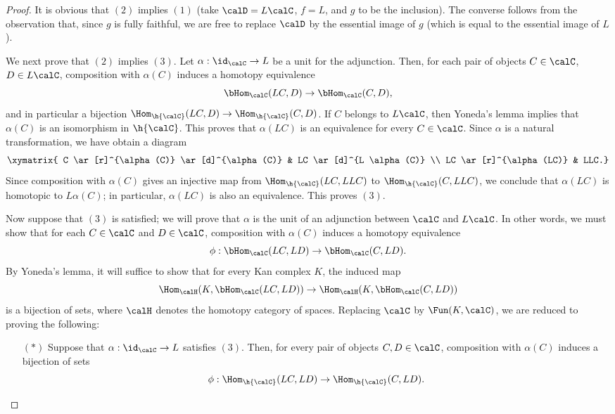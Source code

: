 \begin{proof}
It is obvious that $(2)$ implies $(1)$ (take $\calD= L\calC$, $f = L$, and $g$ to be the inclusion).
The converse follows from the observation that, since $g$ is fully faithful, we are free to replace $\calD$ by the essential image of $g$ (which is equal to the essential image of $L$).

We next prove that $(2)$ implies $(3)$. Let $\alpha: \id_{\calC} \rightarrow L$ be a unit
for the adjunction. Then, for each pair of objects $C \in \calC$, $D \in L \calC$, composition with $\alpha(C)$ induces a homotopy equivalence
$$ \bHom_{\calC}( LC, D) \rightarrow \bHom_{\calC}( C, D),$$
and in particular a bijection $\Hom_{\h{\calC}}(LC, D) \rightarrow \Hom_{\h{\calC}}(C,D)$.
If $C$ belongs to $L \calC$, then Yoneda's lemma implies that
$\alpha(C)$ is an isomorphism in $\h{\calC}$. This proves that $\alpha(LC)$ is an equivalence for every $C \in \calC$. Since $\alpha$ is a natural transformation, we have obtain a diagram
$$ \xymatrix{ C \ar[r]^{\alpha(C)} \ar[d]^{\alpha(C)} & LC \ar[d]^{L \alpha(C)}  \\
LC \ar[r]^{\alpha(LC)} & LLC.}$$
Since composition with $\alpha(C)$ gives an injective map
from $\Hom_{\h{\calC}}(LC,LLC)$ to $\Hom_{\h{\calC}}(C,LLC)$, we conclude that
$\alpha(LC)$ is homotopic to $L \alpha(C)$; in particular, $\alpha(LC)$ is also an equivalence. This proves $(3)$.

Now suppose that $(3)$ is satisfied; we will prove that $\alpha$ is the unit of an adjunction between $\calC$ and $L \calC$. In other words, we must show that for each $C \in \calC$ and
$D \in \calC$, composition with $\alpha(C)$ induces a homotopy equivalence 
$$ \phi: \bHom_{\calC}( LC, LD) \rightarrow \bHom_{\calC}( C, LD).$$
By Yoneda's lemma, it will suffice to show that for every Kan complex $K$, the induced map
$$ \Hom_{\calH}( K, \bHom_{\calC}(LC, LD)) \rightarrow \Hom_{\calH}(K, \bHom_{\calC}(C,LD))$$
is a bijection of sets, where $\calH$ denotes the homotopy category of spaces. Replacing
$\calC$ by $\Fun(K, \calC)$, we are reduced to proving the following:

\begin{itemize}
\item[$(\ast)$] Suppose that $\alpha: \id_{\calC} \rightarrow L$ satisfies $(3)$. Then, for every
pair of objects $C, D \in \calC$, composition with $\alpha(C)$ induces a bijection of sets
$$ \phi: \Hom_{ \h{\calC}}( LC, LD) \rightarrow \Hom_{ \h{\calC}}(C, LD).$$
\end{itemize}


\end{proof}
